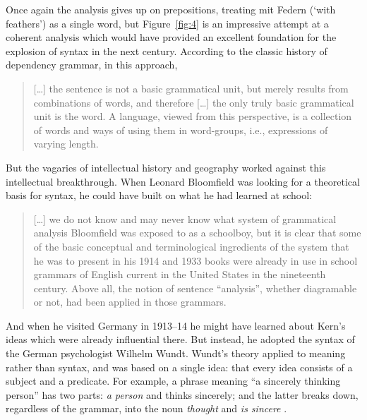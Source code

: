 \documentclass[output=paper]{langscibook}
\begin{document}
Once again the analysis gives up on prepositions, treating mit Federn (‘with feathers’) as a single word, but Figure~\ref{fig:4} is an impressive attempt at a coherent analysis which would have provided an excellent foundation for the explosion of syntax in the next century. According to the classic history of dependency grammar, in this approach,

\begin{quotation}
	[\dots] the sentence is not a basic grammatical unit, but merely results from combinations of words, and therefore [\dots] the only truly basic grammatical unit is the word. A language, viewed from this perspective, is a collection of words and ways of using them in word-groups, i.e., expressions of varying length. \citep[21]{Percival1976}
\end{quotation}

But the vagaries of intellectual history and geography worked against this intellectual breakthrough. When Leonard Bloomfield was looking for a theoretical basis for syntax, he could have built on what he had learned at school:

\begin{quotation}
	[\dots] we do not know and may never know what system of grammatical analysis Bloomfield was exposed to as a schoolboy, but it is clear that some of the basic conceptual and terminological ingredients of the system that he was to present in his 1914 and 1933 books were already in use in school grammars of English current in the United States in the nineteenth century. Above all, the notion of sentence ``analysis'', whether diagramable or not, had been applied in those grammars. \citep[18]{Percival1976}
\end{quotation}

And when he visited Germany in 1913--14 he might have learned about Kern’s ideas which were already influential there. But instead, he adopted the syntax of the German psychologist Wilhelm Wundt. Wundt’s theory applied to meaning rather than syntax, and was based on a single idea: that every idea consists of a subject and a predicate. For example, a phrase meaning ``a sincerely thinking person'' has two parts: \emph{a person} and thinks sincerely; and the latter breaks down, regardless of the grammar, into the noun \emph{thought} and \emph{is sincere} \citep{Percival1976}.
\end{document}
